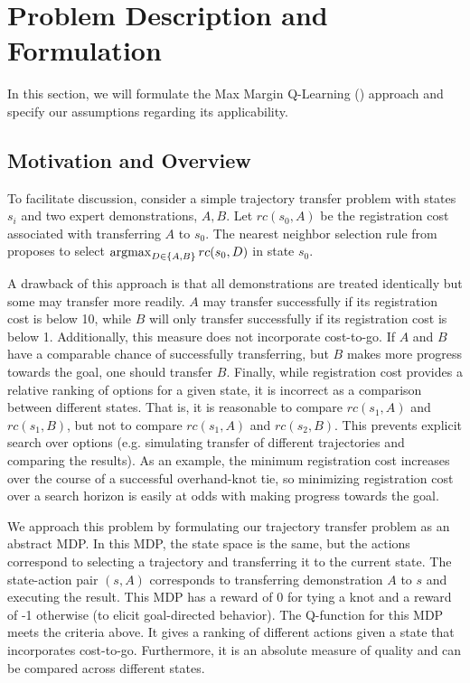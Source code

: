 \section{Problem Description and Formulation}
\label{sec:formulation}
%

In this section, we will formulate the Max Margin Q-Learning (\mmql{}) approach and
specify our assumptions regarding its applicability.

\subsection{Motivation and Overview}
To facilitate discussion, consider a simple trajectory transfer
problem with states $s_i$ and two expert demonstrations, $A, B$. Let
$rc(s_0, A)$ be the registration cost associated with transferring $A$
to $s_0$. The nearest neighbor selection rule from
\citet{Schulmanetal_ISRR2013} proposes to select $\operatorname*{argmax}_{D \in \{A,
  B\}} rc(s_0, D)$ in state $s_0$.

A drawback of this approach is that all demonstrations are treated
identically but some may transfer more readily.  $A$ may transfer
successfully if its registration cost is below 10, while $B$ will only
transfer successfully if its registration cost is below 1.
Additionally, this measure does not incorporate cost-to-go. If $A$ and
$B$ have a comparable chance of successfully transferring, but $B$
makes more progress towards the goal, one should transfer
$B$. Finally, while registration cost provides a relative ranking of
options for a given state, it is incorrect as a comparison between
different states. That is, it is reasonable to compare $rc(s_1, A)$
and $rc(s_1, B)$, but not to compare $rc(s_1, A)$ and $rc(s_2,
B)$. This prevents explicit search over options (e.g. simulating
transfer of different trajectories and comparing the results). As an
example, the minimum registration cost increases over the course of a
successful overhand-knot tie, so minimizing registration cost over a
search horizon is easily at odds with making progress towards the
goal.

We approach this problem by formulating our trajectory transfer
problem as an abstract MDP.  In this MDP, the state space is the same,
but the actions correspond to selecting a trajectory and transferring
it to the current state. The state-action pair $(s, A)$ corresponds to
transferring demonstration $A$ to $s$ and executing the result. This
MDP has a reward of 0 for tying a knot and a reward of -1 otherwise
(to elicit goal-directed behavior). The Q-function for this MDP meets
the criteria above. It gives a ranking of different actions given a
state that incorporates cost-to-go. Furthermore, it is an absolute
measure of quality and can be compared across different states.


